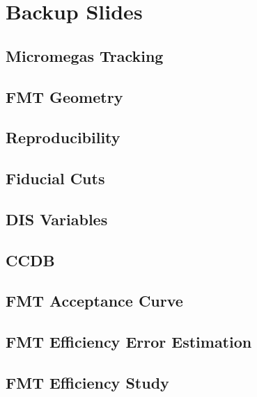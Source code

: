 \section*{Backup Slides}
\begin{frame}{}
    \centering \Huge{}
\end{frame}

\subsection*{Micromegas Tracking}


\subsection*{FMT Geometry}


\subsection*{Reproducibility}


\subsection*{Fiducial Cuts}


\subsection*{DIS Variables}


\subsection*{CCDB}


\subsection*{FMT Acceptance Curve}


\subsection*{FMT Efficiency Error Estimation}


\subsection*{FMT Efficiency Study}


